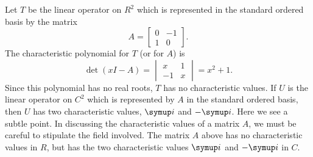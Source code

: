 \begin{example}\label{example:6.1}
    Let \(T\) be the linear operator on \(R^2\) which is represented in the standard ordered basis by the matrix
    \begin{equation*}
        A=
        \begin{bmatrix}
            0 & -1 \\
            1 & 0
        \end{bmatrix}
        .
    \end{equation*}
    The characteristic polynomial for \(T\) (or for \(A\)) is
    \begin{equation*}
        \det\left(xI-A\right)=
        \begin{vmatrix}
            x & 1 \\
            -1 & x
        \end{vmatrix}
        =x^2+1.
    \end{equation*}
    Since this polynomial has no real roots, \(T\) has no characteristic values. If \(U\) is the linear operator on \(C^2\) which is represented by \(A\) in the standard ordered basis, then \(U\) has two characteristic values, \(\iu\) and \(-\iu\). Here we see a subtle point. In discussing the characteristic values of a matrix \(A\), we must be careful to stipulate the field involved. The matrix \(A\) above has no characteristic values in \(R\), but has the two characteristic values \(\iu\) and \(-\iu\) in \(C\).
\end{example}

